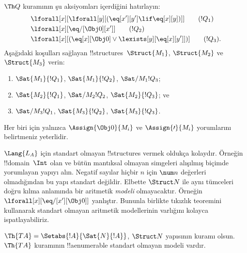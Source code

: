 \begin{prob}
$\Th Q$ kuramının şu aksiyomları içerdiğini hatırlayın:
\begin{align*}
& \lforall[x][\lforall[y][(\eq[x'][y'] \lif \eq[x][y])]] \tag{$!Q_1$}\\
& \lforall[x][\eq/[\Obj 0][x']] \tag{$!Q_2$}\\
& \lforall[x][(\eq[x][\Obj 0] \lor \lexists[y][\eq[x][y']])] \tag{$!Q_3$}.
\end{align*}
Aşağıdaki koşulları sağlayan !!{structure}s~$\Struct{M_1}$,
$\Struct{M_2}$ ve $\Struct{M_3}$ verin:
\begin{enumerate}
\item $\Sat{M_1}{!Q_1}$, $\Sat{M_1}{!Q_2}$, $\Sat/{M_1}{!Q_3}$;
\item $\Sat{M_2}{!Q_1}$, $\Sat/{M_2}{!Q_2}$, $\Sat{M_2}{!Q_3}$; ve
\item $\Sat/{M_3}{!Q_1}$, $\Sat{M_3}{!Q_2}$, $\Sat{M_3}{!Q_3}$.
\end{enumerate}
Her biri için yalnızca $\Assign{\Obj0}{M_i}$ ve
$\Assign{\prime}{M_i}$ yorumlarını belirtmeniz yeterlidir.
\end{prob}

\begin{explain}
$\Lang{L_A}$ için standart olmayan !!{structure}s vermek oldukça
kolaydır. Örneğin !!{domain}~$\Int$ olan ve bütün mantıksal olmayan
simgeleri alışılmış biçimde yorumlayan yapıyı alın. Negatif sayılar
hiçbir $n$ için $\num n$ değerleri olmadığından bu yapı standart
değildir. Elbette $\Struct N$ ile aynı tümceleri doğru kılma anlamında
bir aritmetik \emph{modeli} olmayacaktır. Örneğin
$\lforall[x][\eq/[x'][\Obj0]]$ yanlıştır. Bununla birlikte tıkızlık
teoremini kullanarak standart olmayan aritmetik modellerinin varlığını
kolayca ispatlayabiliriz.
\end{explain}

\begin{prop}
$\Th{TA}=\Setabs{!A}{\Sat{N}{!A}}$, $\Struct N$ yapısının kuramı olsun.
$\Th{TA}$ kuramının !!a{enumerable} standart olmayan modeli vardır.
\end{prop}

